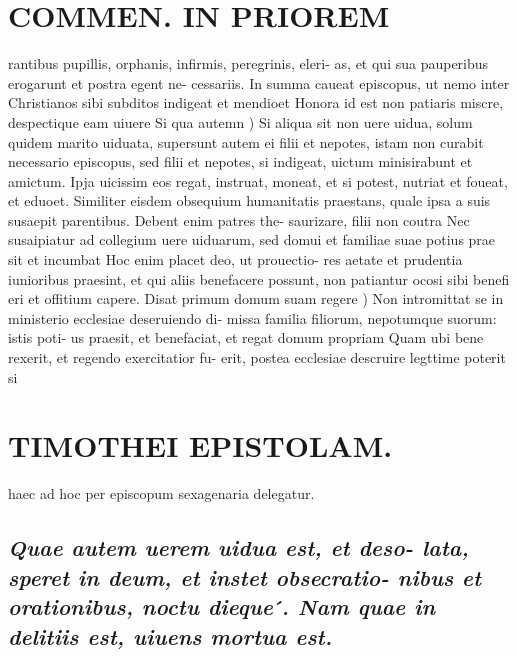 \documentclass{article}
\begin{document}
\begin{pages}
\section*{COMMEN. IN PRIOREM }
\marginpar{[ p.118 ]}\pstart rantibus pupillis, orphanis, infirmis, peregrinis, eleri- as, et qui sua pauperibus erogarunt et postra egent ne- cessariis. In summa caueat episcopus, ut nemo inter Christianos sibi subditos indigeat et mendioet Honora id est non patiaris miscre, despectique eam uiuere  \pend\pstart Si qua autemn ) Si aliqua sit non uere uidua, solum quidem marito uiduata, supersunt autem ei filii et nepotes, istam non curabit necessario episcopus, sed filii et nepotes, si indigeat, uictum minisirabunt et amictum. Ipja uicissim eos regat, instruat, moneat, et si potest, nutriat et foueat, et eduoet. Similiter eisdem obsequium humanitatis praestans, quale ipsa a suis susaepit parentibus. Debent enim patres the- saurizare, filii non coutra Nec susaipiatur ad collegium uere uiduarum, sed domui et familiae suae potius prae sit et incumbat Hoc enim placet deo, ut prouectio- res aetate et prudentia iunioribus praesint, et qui aliis benefacere possunt, non patiantur ocosi sibi benefi eri et offitium capere.  \pend\pstart Disat primum domum suam regere ) Non intromittat se in ministerio ecclesiae deseruiendo di- missa familia filiorum, nepotumque suorum: istis poti- us praesit, et benefaciat, et regat domum propriam Quam ubi bene rexerit, et regendo exercitatior fu- erit, postea ecclesiae descruire legttime poterit si  \pend
\section*{TIMOTHEI EPISTOLAM. }
\marginpar{[ p.119 ]}\pstart haec ad hoc per episcopum sexagenaria delegatur.  \pend
{}
{}
\subsection*{\textit{Quae autem uerem uidua est, et deso- lata, speret in deum, et instet obsecratio- nibus et orationibus, noctu dieque ́. Nam quae in delitiis est, uiuens mortua est. }}
{}

\end{pages}
\end{document}
